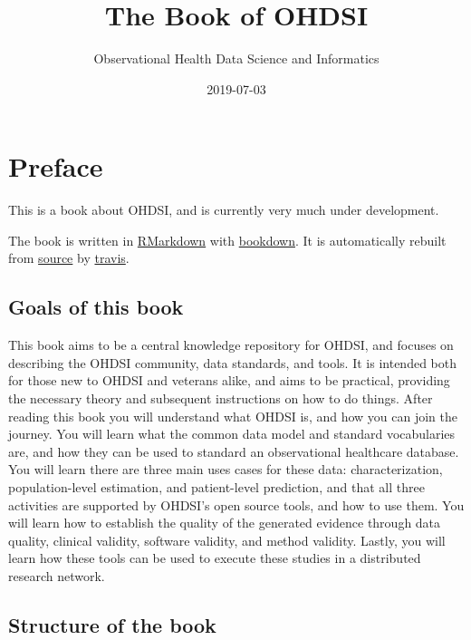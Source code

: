 \documentclass[11pt]{book}
\title{The Book of OHDSI}
\author{Observational Health Data Science and Informatics}
\date{2019-07-03}
\begin{document}
\maketitle

{
\setcounter{tocdepth}{1}
\tableofcontents
}
\chapter*{Preface}\label{preface}

 This is a book about OHDSI, and is currently very much under
development.

The book is written in \href{https://rmarkdown.rstudio.com}{RMarkdown}
with \href{https://bookdown.org}{bookdown}. It is automatically rebuilt
from \href{https://github.com/OHDSI/TheBookOfOhdsi}{source} by
\href{http://travis-ci.org/}{travis}.

\section*{Goals of this book}\label{goals-of-this-book}

This book aims to be a central knowledge repository for OHDSI, and
focuses on describing the OHDSI community, data standards, and tools. It
is intended both for those new to OHDSI and veterans alike, and aims to
be practical, providing the necessary theory and subsequent instructions
on how to do things. After reading this book you will understand what
OHDSI is, and how you can join the journey. You will learn what the
common data model and standard vocabularies are, and how they can be
used to standard an observational healthcare database. You will learn
there are three main uses cases for these data: characterization,
population-level estimation, and patient-level prediction, and that all
three activities are supported by OHDSI's open source tools, and how to
use them. You will learn how to establish the quality of the generated
evidence through data quality, clinical validity, software validity, and
method validity. Lastly, you will learn how these tools can be used to
execute these studies in a distributed research network.

\section*{Structure of the book}\label{structure-of-the-book}
\end{document}
